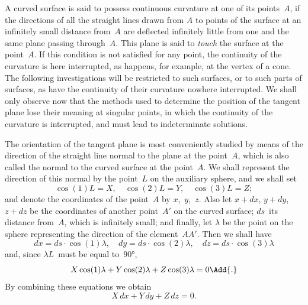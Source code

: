
A curved surface is said to possess continuous curvature at one of its points~$A$, if the
directions of all the straight lines drawn from $A$ to points of the surface at an infinitely
small distance from~$A$ are deflected infinitely little from one and the same plane passing
through~$A$. This plane is said to \emph{touch} the surface at the point~$A$. If this condition is
not satisfied for any point, the continuity of the curvature is here interrupted, as happens,
for example, at the vertex of a cone. The following investigations will be restricted to
such surfaces, or to such parts of surfaces, as have the continuity of their curvature
nowhere interrupted. We shall only observe now that the methods used to determine
the position of the tangent plane lose their meaning at singular points, in which the
continuity of the curvature is interrupted, and must lead to indeterminate solutions.



The orientation of the tangent plane is most conveniently studied by means of the
direction of the straight line normal to the plane at the point~$A$, which is also called the
normal to the curved surface at the point~$A$. We shall represent the direction of this
normal by the point~$L$ on the auxiliary sphere, and we shall set
\[
\cos (1)L = X,\quad \cos (2)L = Y,\quad \cos (3)L = Z;
\]
and denote the coordinates of the point~$A$ by $x$,~$y$,~$z$. Also let $x + dx$, $y + dy$, $z + dz$
be the coordinates of another point~$A'$ on the curved surface; $ds$~its distance from~$A$,
which is infinitely small; and finally, let $\lambda$ be the point on the sphere representing the
direction of the element~$AA'$. Then we shall have
\[
dx = ds·\cos (1)\lambda,\quad
dy = ds·\cos (2)\lambda,\quad
dz = ds·\cos (3)\lambda
\]
and, since $\lambda L$~must be equal to~$90°$,
\[
X\cos (1)\lambda + Y\cos (2)\lambda + Z\cos (3)\lambda = 0\Add{.}
\]
By combining these equations we obtain
\[
X\, dx + Y\, dy + Z\, dz = 0.
\]

